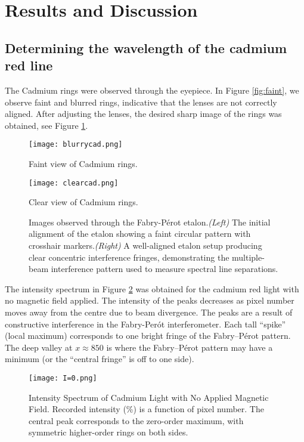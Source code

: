 \documentclass[11pt,twocolumn, a4paper]{article}
\numberwithin{equation}{section} %
\numberwithin{figure}{section} %
\numberwithin{table}{section} %
\begin{document}
\section{Results and Discussion}
\subsection{Determining the wavelength of the cadmium red line}
The Cadmium rings were observed through the eyepiece. In Figure \ref{fig:faint}, we observe faint and blurred rings, indicative that the lenses are not correctly aligned. After adjusting the lenses, the desired sharp image of the rings was obtained, see Figure \ref{fig:clear}.
\begin{figure}[htbp]
    \centering
    \begin{minipage}{0.3\textwidth}
        \centering
        \texttt{[image: blurrycad.png]}
        \caption{Faint view of Cadmium rings.}
        \label{fig:faint}
    \end{minipage}
    \hfill
    \begin{minipage}{0.3\textwidth}
        \centering
        \texttt{[image: clearcad.png]}
        \caption{Clear view of Cadmium rings. }
        \label{fig:clear}
    \end{minipage}
    \caption{Images observed through the Fabry-Pérot etalon.\textit{(Left)} The initial alignment of the etalon showing a faint circular pattern with crosshair markers.\textit{(Right)} A well-aligned etalon setup producing clear concentric interference fringes, demonstrating the multiple-beam interference pattern used to measure spectral line separations. }
\end{figure}
The intensity spectrum in Figure \ref{fig:I=0} was obtained for the cadmium red light with no magnetic field applied. The intensity of the peaks decreases as pixel number moves away from the centre due to beam divergence. The peaks are a result of constructive interference in the Fabry-Perót interferometer. Each tall ``spike” (local maximum) corresponds to one bright fringe of the Fabry–Pérot pattern. The deep valley at \(x \approx 850\) is where the Fabry–Pérot pattern may have a minimum (or the “central fringe” is off to one side). 
\begin{figure}[H]
    \centering
    \texttt{[image: I=0.png]}
    \caption{Intensity Spectrum of Cadmium Light with No Applied Magnetic Field. Recorded intensity (\%) is a function of pixel number. The central peak corresponds to the zero-order maximum, with symmetric higher-order rings on both sides.}
    \label{fig:I=0}
\end{figure}
\end{document}

